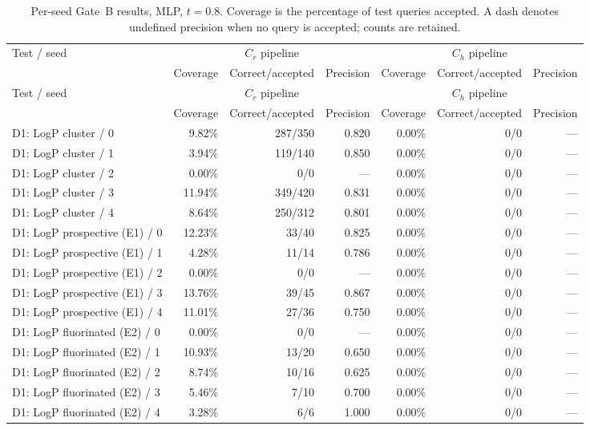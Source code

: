 \begin{longtable}{@{}lrrrrrr@{}}
\caption{Per-seed Gate~B results, MLP, $t=0.8$. Coverage is the percentage of test queries accepted. A dash denotes undefined precision when no query is accepted; counts are retained.}\\
\toprule
Test / seed & \multicolumn{3}{c}{$C_r$ pipeline} & \multicolumn{3}{c}{$C_h$ pipeline} \\
 & Coverage & Correct/accepted & Precision & Coverage & Correct/accepted & Precision \\
\midrule
\endfirsthead
\toprule
Test / seed & \multicolumn{3}{c}{$C_r$ pipeline} & \multicolumn{3}{c}{$C_h$ pipeline} \\
 & Coverage & Correct/accepted & Precision & Coverage & Correct/accepted & Precision \\
\midrule
\endhead
\bottomrule
\endfoot
D1: LogP cluster / 0 & 9.82\% & 287/350 & 0.820 & 0.00\% & 0/0 & --- \\
D1: LogP cluster / 1 & 3.94\% & 119/140 & 0.850 & 0.00\% & 0/0 & --- \\
D1: LogP cluster / 2 & 0.00\% & 0/0 & --- & 0.00\% & 0/0 & --- \\
D1: LogP cluster / 3 & 11.94\% & 349/420 & 0.831 & 0.00\% & 0/0 & --- \\
D1: LogP cluster / 4 & 8.64\% & 250/312 & 0.801 & 0.00\% & 0/0 & --- \\
\addlinespace
D1: LogP prospective (E1) / 0 & 12.23\% & 33/40 & 0.825 & 0.00\% & 0/0 & --- \\
D1: LogP prospective (E1) / 1 & 4.28\% & 11/14 & 0.786 & 0.00\% & 0/0 & --- \\
D1: LogP prospective (E1) / 2 & 0.00\% & 0/0 & --- & 0.00\% & 0/0 & --- \\
D1: LogP prospective (E1) / 3 & 13.76\% & 39/45 & 0.867 & 0.00\% & 0/0 & --- \\
D1: LogP prospective (E1) / 4 & 11.01\% & 27/36 & 0.750 & 0.00\% & 0/0 & --- \\
\addlinespace
D1: LogP fluorinated (E2) / 0 & 0.00\% & 0/0 & --- & 0.00\% & 0/0 & --- \\
D1: LogP fluorinated (E2) / 1 & 10.93\% & 13/20 & 0.650 & 0.00\% & 0/0 & --- \\
D1: LogP fluorinated (E2) / 2 & 8.74\% & 10/16 & 0.625 & 0.00\% & 0/0 & --- \\
D1: LogP fluorinated (E2) / 3 & 5.46\% & 7/10 & 0.700 & 0.00\% & 0/0 & --- \\
D1: LogP fluorinated (E2) / 4 & 3.28\% & 6/6 & 1.000 & 0.00\% & 0/0 & --- \\

\end{longtable}
